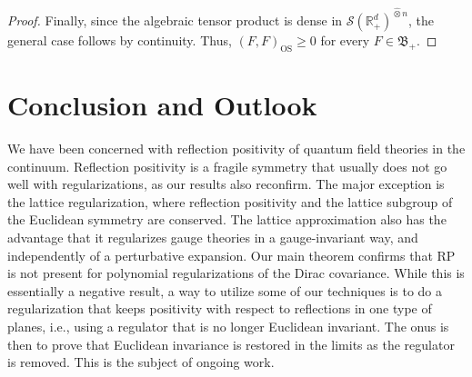 \documentclass[10pt,a4paper,oneside,reqno]{amsart}
\newcommand{\reals}{\mathbb{R}}
\begin{document}
\begin{proof}
    Finally, since the algebraic tensor product is dense in $\mathcal S(\reals^d_+)^{\hat\otimes n}$, the general case follows by continuity. Thus, $(F,F)_{\mathrm{OS}} \ge 0$ for every $F\in \mathfrak B_+$.
\end{proof}


\section{Conclusion and Outlook}

We have been concerned with reflection positivity of quantum field theories in the continuum. Reflection positivity is a fragile symmetry that usually does not go well with regularizations, as our results also reconfirm. The major exception is the lattice regularization, where reflection positivity and the lattice subgroup of the Euclidean symmetry are conserved. The lattice approximation also has the advantage that it regularizes gauge theories in a gauge-invariant way, and independently of a perturbative expansion. Our main theorem confirms that RP is not present for polynomial regularizations of the Dirac covariance. While this is essentially a negative result, a way to utilize some of our techniques is to do a regularization that keeps positivity with respect to reflections in one type of planes, i.e., using a regulator that is no longer Euclidean invariant. The onus is then to prove that Euclidean invariance is restored in the limits as the regulator is removed. This is the subject of ongoing work. 
\end{document}
